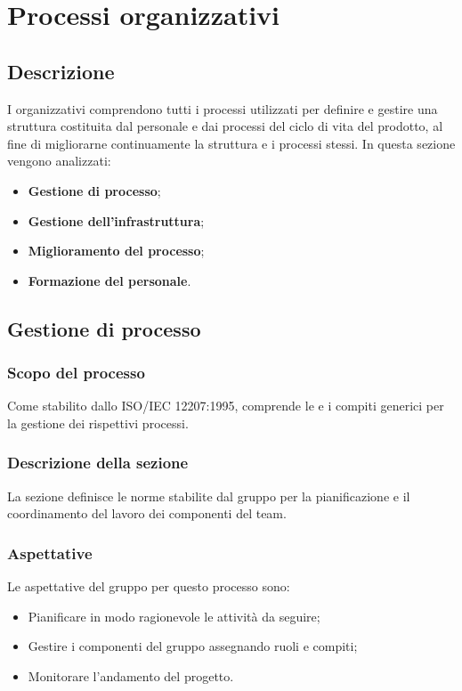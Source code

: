 \section{Processi organizzativi}
\label{PO}
\subsection{Descrizione}\label{PO_Descrizione}
I  organizzativi comprendono tutti i processi utilizzati per definire e gestire una struttura costituita dal personale e dai processi del ciclo di vita del prodotto, al fine di migliorarne continuamente la struttura e i processi stessi.
In questa sezione vengono analizzati:
\begin{itemize}
	\item \textbf{Gestione di processo};
	\item \textbf{Gestione dell'infrastruttura};
	\item \textbf{Miglioramento del processo};
	\item \textbf{Formazione del personale}.
\end{itemize}

\subsection{Gestione di processo}
\subsubsection{Scopo del processo}\label{PO_GestioneProcesso_Scopo}
Come stabilito dallo  ISO/IEC 12207:1995, comprende le  e i compiti generici per la gestione dei rispettivi processi.

\subsubsection{Descrizione della sezione}
La sezione definisce le norme stabilite dal gruppo per la pianificazione e il coordinamento del lavoro dei componenti del team.

\subsubsection{Aspettative}
Le aspettative del gruppo per questo processo sono:
\begin{itemize}
	\item Pianificare in modo ragionevole le attività da seguire;
	\item Gestire i componenti del gruppo assegnando ruoli e compiti;
	\item Monitorare l'andamento del progetto.
\end{itemize}


